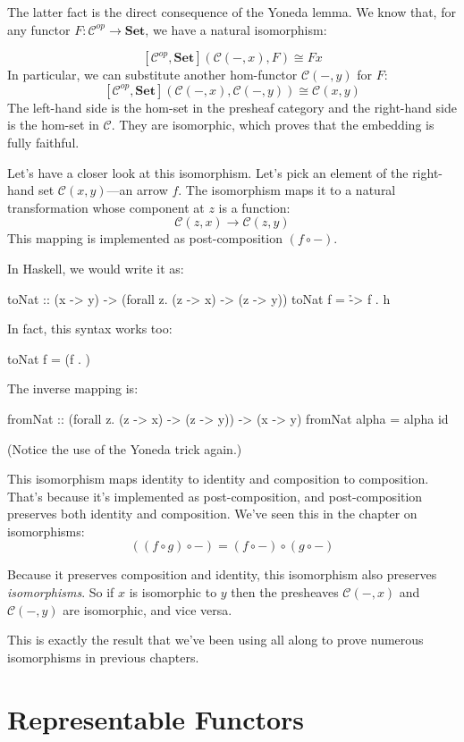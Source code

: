 \documentclass[DaoFP]{subfiles}
\begin{document}
The latter fact is the direct consequence of the Yoneda lemma. We know that, for any functor $F \colon \mathcal{C}^{op} \to \mathbf{Set}$, we have a natural isomorphism:

\[ [\mathcal{C}^{op}, \mathbf{Set}]( \mathcal{C}(-, x), F) \cong F x \]
In particular, we can substitute another hom-functor $\mathcal{C}(-, y)$ for $F$:
\[ [\mathcal{C}^{op}, \mathbf{Set}]( \mathcal{C}(-, x), \mathcal{C}(-, y)) \cong \mathcal{C}(x, y)\]
The left-hand side is the hom-set in the presheaf category and the right-hand side is the hom-set in $\mathcal{C}$. They are isomorphic, which proves that the embedding is fully faithful.

Let's have a closer look at this isomorphism. Let's pick an element of the right-hand set $\mathcal{C}(x, y)$---an arrow $f$. The isomorphism maps it to a natural transformation whose component at $z$ is a function:
\[ \mathcal{C}(z, x) \to \mathcal{C}(z, y) \]
This mapping is implemented as post-composition $(f \circ -)$.

In Haskell, we would write it as:
\begin{haskell}
toNat :: (x -> y) -> (forall z. (z -> x) -> (z -> y))
toNat f = \h -> f . h 
\end{haskell}
In fact, this syntax works too:
\begin{haskell}
toNat f = (f . )
\end{haskell}
The inverse mapping is:
\begin{haskell}
fromNat :: (forall z. (z -> x) -> (z -> y)) -> (x -> y)
fromNat alpha = alpha id
\end{haskell}
(Notice the use of the Yoneda trick again.)

This isomorphism maps identity to identity and composition to composition. That's because it's implemented as post-composition, and post-composition preserves both identity and composition. We've seen this in the chapter on isomorphisms:
\[ ((f \circ g) \circ -) = (f \circ -) \circ (g \circ -) \]

Because it preserves composition and identity, this isomorphism also preserves \emph{isomorphisms}. So if $x$ is isomorphic to $y$ then the presheaves $ \mathcal{C}(-, x)$ and $ \mathcal{C}(-, y)$ are isomorphic, and vice versa. 

This is exactly the result that we've been using all along to prove numerous isomorphisms in previous chapters. 

\section{Representable Functors}
\end{document}
